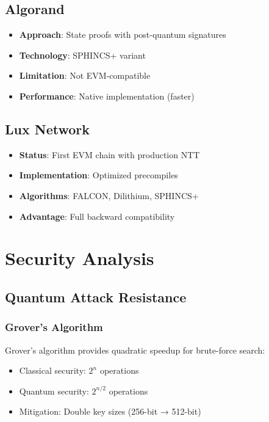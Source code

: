 \documentclass[11pt,a4paper]{article}
\begin{document}
\subsection{Algorand}

\begin{itemize}
\item \textbf{Approach}: State proofs with post-quantum signatures
\item \textbf{Technology}: SPHINCS+ variant
\item \textbf{Limitation}: Not EVM-compatible
\item \textbf{Performance}: Native implementation (faster)
\end{itemize}

\subsection{Lux Network}

\begin{itemize}
\item \textbf{Status}: First EVM chain with production NTT
\item \textbf{Implementation}: Optimized precompiles
\item \textbf{Algorithms}: FALCON, Dilithium, SPHINCS+
\item \textbf{Advantage}: Full backward compatibility
\end{itemize}

\section{Security Analysis}

\subsection{Quantum Attack Resistance}

\subsubsection{Grover's Algorithm}
Grover's algorithm provides quadratic speedup for brute-force search:
\begin{itemize}
\item Classical security: $2^n$ operations
\item Quantum security: $2^{n/2}$ operations
\item Mitigation: Double key sizes (256-bit → 512-bit)
\end{itemize}
\end{document}
